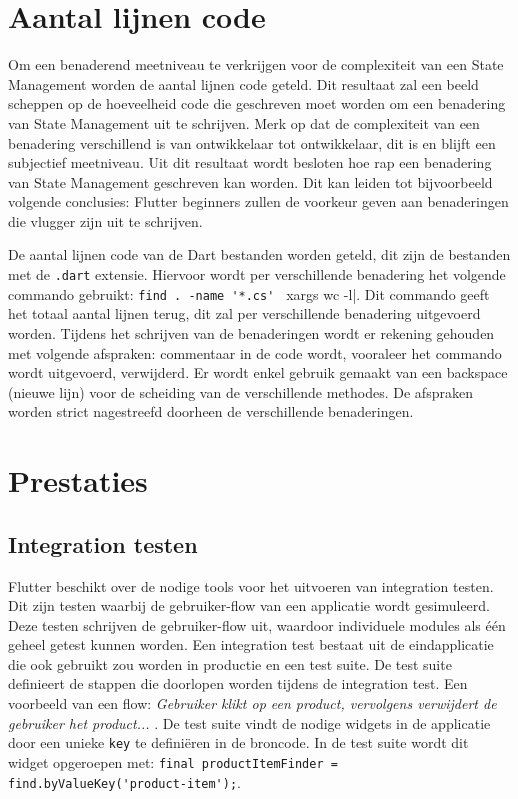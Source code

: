 \section{Aantal lijnen code}
Om een benaderend meetniveau te verkrijgen voor de complexiteit van een State Management worden de aantal lijnen code geteld. Dit resultaat zal een beeld scheppen op de hoeveelheid code die geschreven moet worden om een benadering van State Management uit te schrijven. Merk op dat de complexiteit van een benadering verschillend is van ontwikkelaar tot ontwikkelaar, dit is en blijft een subjectief meetniveau. Uit dit resultaat wordt besloten hoe rap een benadering van State Management geschreven kan worden. Dit kan leiden tot bijvoorbeeld volgende conclusies: Flutter beginners zullen de voorkeur geven aan benaderingen die vlugger zijn uit te schrijven. 

De aantal lijnen code van de Dart bestanden worden geteld, dit zijn de bestanden met de \verb|.dart| extensie. Hiervoor wordt per verschillende benadering het volgende commando gebruikt: \verb|find . -name '*.cs' | xargs wc -l|. Dit commando geeft het totaal aantal lijnen terug, dit zal per verschillende benadering uitgevoerd worden. Tijdens het schrijven van de benaderingen wordt er rekening gehouden met volgende afspraken: commentaar in de code wordt, vooraleer het commando wordt uitgevoerd, verwijderd. Er wordt enkel gebruik gemaakt van een backspace (nieuwe lijn) voor de scheiding van de verschillende methodes. De afspraken worden strict nagestreefd doorheen de verschillende benaderingen.

\section{Prestaties}
\label{se:prestaties}
\subsection{Integration testen}
Flutter beschikt over de nodige tools voor het uitvoeren van integration testen. Dit zijn testen waarbij de gebruiker-flow van een applicatie wordt gesimuleerd. Deze testen schrijven de gebruiker-flow uit, waardoor individuele modules als één geheel getest kunnen worden. Een integration test bestaat uit de eindapplicatie die ook gebruikt zou worden in productie en een test suite. De test suite definieert de stappen die doorlopen worden tijdens de integration test. Een voorbeeld van een flow: \textit{Gebruiker klikt op een product, vervolgens verwijdert de gebruiker het product...} \autocite{Flutter2019b}. De test suite vindt de nodige widgets in de applicatie door een unieke \verb|key| te definiëren in de broncode. In de test suite wordt dit widget opgeroepen met: \verb|final productItemFinder = find.byValueKey('product-item');|.

